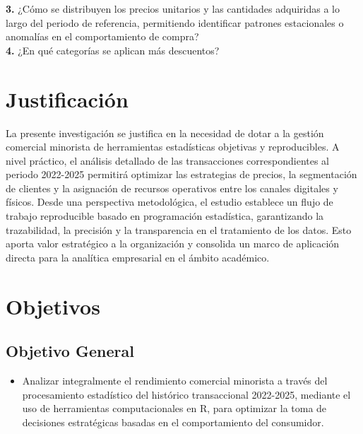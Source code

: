 \documentclass[oneside,11pt]{Latex/Classes/PhDthesisPSnPDF}
\begin{document}
\textbf{3.} ¿Cómo se distribuyen los precios unitarios y las cantidades
adquiridas a lo largo del periodo de referencia, permitiendo identificar
patrones estacionales o anomalías en el comportamiento de compra?\\

\textbf{4.} ¿En qué categorías se aplican más descuentos?\\

\section{Justificación}

La presente investigación se justifica en la necesidad de dotar a la
gestión comercial minorista de herramientas estadísticas objetivas y
reproducibles. A nivel práctico, el análisis detallado de las
transacciones correspondientes al periodo 2022-2025 permitirá optimizar
las estrategias de precios, la segmentación de clientes y la asignación
de recursos operativos entre los canales digitales y físicos. Desde una
perspectiva metodológica, el estudio establece un flujo de trabajo
reproducible basado en programación estadística, garantizando la
trazabilidad, la precisión y la transparencia en el tratamiento de los
datos. Esto aporta valor estratégico a la organización y consolida un
marco de aplicación directa para la analítica empresarial en el ámbito
académico.\\

\section{Objetivos}

\subsection{Objetivo General}
\begin{itemize}
  \item{Analizar integralmente el rendimiento comercial minorista a través del procesamiento estadístico del histórico transaccional 2022-2025, mediante el uso de herramientas computacionales en R, para optimizar la toma de decisiones estratégicas basadas en el comportamiento del consumidor.}
\end{itemize}
\end{document}
